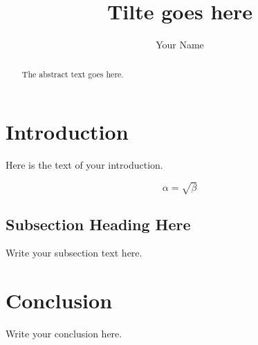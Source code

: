 \documentclass{article}
\begin{document}
\title{Tilte goes here}
\author{Your Name}

\maketitle

\begin{abstract}
The abstract text goes here.
\end{abstract}

\section{Introduction}
Here is the text of your introduction.

\begin{equation}
    \label{simple_equation}
    \alpha = \sqrt{ \beta }
\end{equation}

\subsection{Subsection Heading Here}
Write your subsection text here.


\section{Conclusion}
Write your conclusion here.
\end{document}
